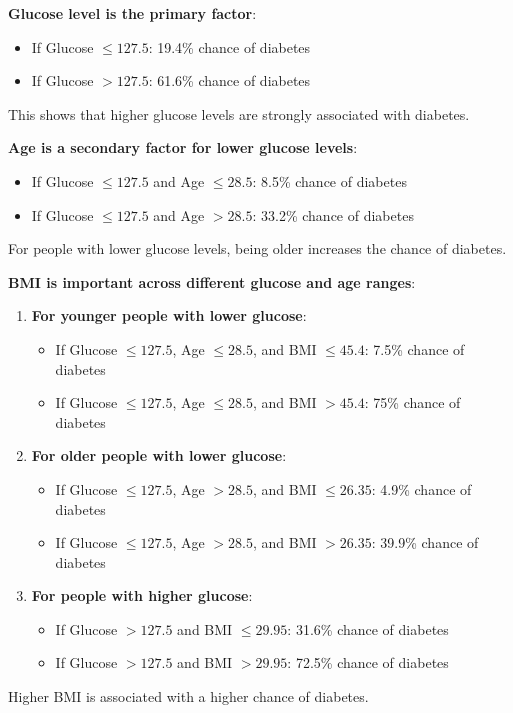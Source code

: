 \documentclass{article}
\begin{document}
\begin{enumerate}[leftmargin=\labelsep]
    \textbf{Glucose level is the primary factor}:
    \begin{itemize}
        \item If Glucose $\leq 127.5$: 19.4\% chance of diabetes
        \item If Glucose $> 127.5$: 61.6\% chance of diabetes
    \end{itemize}
    This shows that higher glucose levels are strongly associated with diabetes.

    \textbf{Age is a secondary factor for lower glucose levels}:
    \begin{itemize}
        \item If Glucose $\leq 127.5$ and Age $\leq 28.5$: 8.5\% chance of diabetes
        \item If Glucose $\leq 127.5$ and Age $> 28.5$: 33.2\% chance of diabetes
    \end{itemize}
    For people with lower glucose levels, being older increases the chance of diabetes.

    \textbf{BMI is important across different glucose and age ranges}:
    \begin{enumerate}[label=\alph*.]
        \item \textbf{For younger people with lower glucose}:
        \begin{itemize}
            \item If Glucose $\leq 127.5$, Age $\leq 28.5$, and BMI $\leq 45.4$: 7.5\% chance of diabetes
            \item If Glucose $\leq 127.5$, Age $\leq 28.5$, and BMI $> 45.4$: 75\% chance of diabetes
        \end{itemize}

        \item \textbf{For older people with lower glucose}:
        \begin{itemize}
            \item If Glucose $\leq 127.5$, Age $> 28.5$, and BMI $\leq 26.35$: 4.9\% chance of diabetes
            \item If Glucose $\leq 127.5$, Age $> 28.5$, and BMI $> 26.35$: 39.9\% chance of diabetes
        \end{itemize}

        \item \textbf{For people with higher glucose}:
        \begin{itemize}
            \item If Glucose $> 127.5$ and BMI $\leq 29.95$: 31.6\% chance of diabetes
            \item If Glucose $> 127.5$ and BMI $> 29.95$: 72.5\% chance of diabetes
        \end{itemize}
    \end{enumerate}
    Higher BMI is associated with a higher chance of diabetes.


\end{enumerate}
\end{document}
